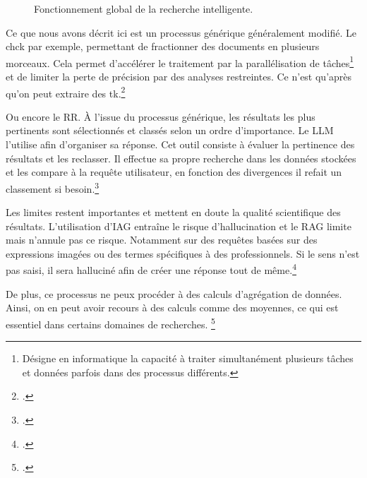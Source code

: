 \begin{figure}[H]
\caption{Fonctionnement global de la recherche intelligente.}
\end{figure}

Ce que nous avons décrit ici est un processus générique généralement modifié. Le \gls{chck} par exemple, permettant de fractionner des documents en plusieurs morceaux. Cela permet d'accélérer le traitement par la parallélisation de tâches\footnote{Désigne en informatique la capacité à traiter simultanément plusieurs tâches et données parfois dans des processus différents.} et de limiter la perte de précision par des analyses restreintes. Ce n'est qu'après qu'on peut extraire des \gls{tk}.\footcite{QuestceQueChunking} 

Ou encore le \gls{RR}. À l'issue du processus générique, les résultats les plus pertinents sont sélectionnés et classés selon un ordre d'importance. Le \gls{LLM} l'utilise afin d'organiser sa réponse. Cet outil consiste à évaluer la pertinence des résultats et les reclasser. Il effectue sa propre recherche dans les données stockées et les compare à la requête utilisateur, en fonction des divergences il refait un classement si besoin.\footcite{ultralyticsQuestCeQuun2026}\newline

Les limites restent importantes et mettent en doute la qualité scientifique des résultats. L'utilisation d'\gls{IAG} entraîne le risque d'hallucination et le \gls{RAG} limite mais n'annule pas ce risque. Notamment sur des requêtes basées sur des expressions imagées ou des termes spécifiques à des  professionnels. Si le sens n'est pas saisi, il sera halluciné afin de créer une réponse tout de même.\footcite{cazzaroQueryingLLMsIf} 

De plus, ce processus ne peux procéder à des calculs d'agrégation de données. Ainsi, on en peut avoir recours à des calculs comme des moyennes, ce qui est essentiel dans certains domaines de recherches. \footcite{cazzaroQueryingLLMsIf} 

